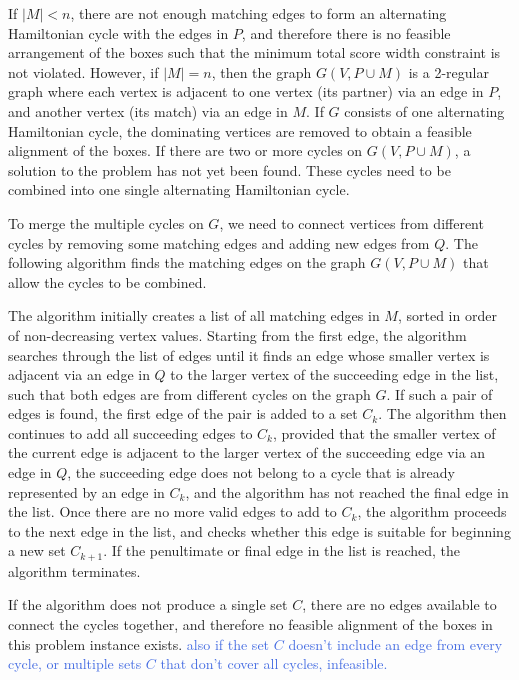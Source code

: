 \documentclass[oribibl]{llncs}
\begin{document}
If $|M| < n$, there are not enough matching edges to form an alternating Hamiltonian cycle with the edges in $P$, and therefore there is no feasible arrangement of the boxes such that the minimum total score width constraint is not violated. However, if $|M| = n$, then the graph $G(V, P \cup M)$ is a 2-regular graph where each vertex is adjacent to one vertex (its partner) via an edge in $P$, and another vertex (its match) via an edge in $M$. If $G$ consists of one alternating Hamiltonian cycle, the dominating vertices are removed to obtain a feasible alignment of the boxes. If there are two or more cycles on $G(V, P \cup M)$, a solution to the problem has not yet been found. These cycles need to be combined into one single alternating Hamiltonian cycle.


To merge the multiple cycles on $G$, we need to connect vertices from different cycles by removing some matching edges and adding new edges from $Q$. The following algorithm finds the matching edges on the graph $G(V, P \cup M)$ that allow the cycles to be combined.


The algorithm initially creates a list of all matching edges in $M$, sorted in order of non-decreasing vertex values. Starting from the first edge, the algorithm searches through the list of edges until it finds an edge whose smaller vertex is adjacent via an edge in $Q$ to the larger vertex of the succeeding edge in the list, such that both edges are from different cycles on the graph $G$. If such a pair of edges is found, the first edge of the pair is added to a set $C_k$. The algorithm then continues to add all succeeding edges to $C_k$, provided that the smaller vertex of the current edge is adjacent to the larger vertex of the succeeding edge via an edge in $Q$, the succeeding edge does not belong to a cycle that is already represented by an edge in $C_k$, and the algorithm has not reached the final edge in the list. Once there are no more valid edges to add to $C_k$, the algorithm proceeds to the next edge in the list, and checks whether this edge is suitable for beginning a new set $C_{k+1}$. If the penultimate or final edge in the list is reached, the algorithm terminates.

If the algorithm does not produce a single set $C$, there are no edges available to connect the cycles together, and therefore no feasible alignment of the boxes in this problem instance exists. \textcolor{RoyalBlue}{also if the set $C$ doesn't include an edge from every cycle, or multiple sets $C$ that don't cover all cycles, infeasible.}
\end{document}
